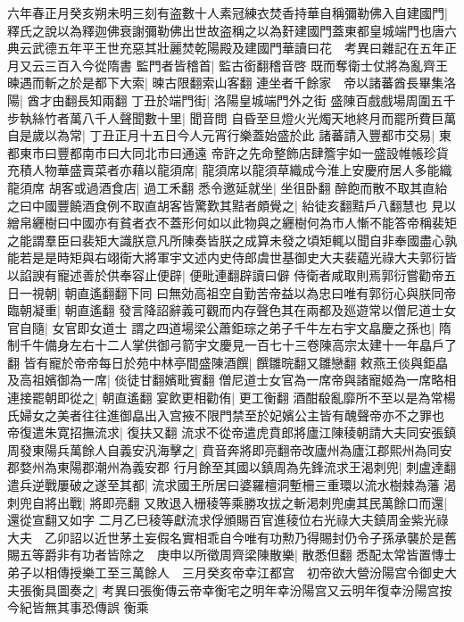 六年春正月癸亥朔未明三刻有盗數十人素冠練衣焚香持華自稱彌勒佛入自建國門|{
	釋氏之說以為釋迦佛衰謝彌勒佛出世故盗稱之以為姧建國門蓋東都皇城端門也唐六典云武德五年平王世充惡其壯麗焚乾陽殿及建國門華讀曰花　考異曰雜記在五年正月又云三百入今從隋書}
監門者皆稽首|{
	監古銜翻稽音啓}
既而奪衛士仗將為亂齊王暕遇而斬之於是都下大索|{
	暕古限翻索山客翻}
連坐者千餘家　帝以諸蕃酋長畢集洛陽|{
	酋才由翻長知兩翻}
丁丑於端門街|{
	洛陽皇城端門外之街}
盛陳百戲戲場周圍五千步執絲竹者萬八千人聲聞數十里|{
	聞音問}
自昏至旦燈火光燭天地終月而罷所費巨萬自是歲以為常|{
	丁丑正月十五日今人元宵行樂蓋始盛於此}
諸蕃請入豐都市交易|{
	東都東市曰豐都南市曰大同北市曰通遠}
帝許之先命整飾店肆簷宇如一盛設帷帳珍貨充積人物華盛賣菜者亦藉以龍須席|{
	龍須席以龍須草織成今淮上安慶府居人多能織龍須席}
胡客或過酒食店|{
	過工禾翻}
悉令邀延就坐|{
	坐徂卧翻}
醉飽而散不取其直紿之曰中國豐饒酒食例不取直胡客皆驚歎其黠者頗覺之|{
	紿徒亥翻黠戶八翻慧也}
見以繒帛纒樹曰中國亦有貧者衣不蓋形何如以此物與之纒樹何為市人慚不能答帝稱裴矩之能謂羣臣曰裴矩大識朕意凡所陳奏皆朕之成算未發之頃矩輒以聞自非奉國盡心孰能若是是時矩與右翊衛大將軍宇文述内史侍郎虞世基御史大夫裴藴光祿大夫郭衍皆以諂諛有寵述善於供奉容止便辟|{
	便毗連翻辟讀曰僻}
侍衛者咸取則焉郭衍嘗勸帝五日一視朝|{
	朝直遙翻翻下同}
曰無効高祖空自勤苦帝益以為忠曰唯有郭衍心與朕同帝臨朝凝重|{
	朝直遙翻}
發言降詔辭義可觀而内存聲色其在兩都及廵遊常以僧尼道士女官自隨|{
	女官即女道士}
謂之四道場梁公蕭鉅琮之弟子千牛左右宇文皛慶之孫也|{
	隋制千牛備身左右十二人掌供御弓箭宇文慶見一百七十三卷陳高宗太建十一年皛戶了翻}
皆有寵於帝帝每日於苑中林亭間盛陳酒饌|{
	饌雛晥翻又雛戀翻}
敕燕王倓與鉅皛及高祖嬪御為一席|{
	倓徒甘翻嬪毗賓翻}
僧尼道士女官為一席帝與諸寵姬為一席略相連接罷朝即從之|{
	朝直遙翻}
宴飲更相勸侑|{
	更工衡翻}
酒酣殽亂靡所不至以是為常楊氏婦女之美者往往進御皛出入宫掖不限門禁至於妃嬪公主皆有醜聲帝亦不之罪也　帝復遣朱寛招撫流求|{
	復扶又翻}
流求不從帝遣虎賁郎將廬江陳稜朝請大夫同安張鎮周發東陽兵萬餘人自義安汎海擊之|{
	賁音奔將即亮翻帝改廬州為廬江郡熙州為同安郡婺州為東陽郡潮州為義安郡}
行月餘至其國以鎮周為先鋒流求王渴刺兜|{
	刺盧達翻}
遣兵逆戰屢破之遂至其都|{
	流求國王所居曰婆羅檀洞塹柵三重環以流水樹棘為藩}
渴刺兜自將出戰|{
	將即亮翻}
又敗退入栅稜等乘勝攻拔之斬渇刺兜虜其民萬餘口而還|{
	還從宣翻又如字}
二月乙巳稜等獻流求俘頒賜百官進稜位右光祿大夫鎮周金紫光祿大夫　乙卯詔以近世茅土妄假名實相乖自今唯有功勲乃得賜封仍令子孫承襲於是舊賜五等爵非有功者皆除之　庚申以所徵周齊梁陳散樂|{
	散悉但翻}
悉配太常皆置慱士弟子以相傳授樂工至三萬餘人　三月癸亥帝幸江都宫　初帝欲大營汾陽宫令御史大夫張衡具圖奏之|{
	考異曰張衡傳云帝幸衡宅之明年幸汾陽宫又云明年復幸汾陽宫按今紀皆無其事恐傳誤}
衡乘

